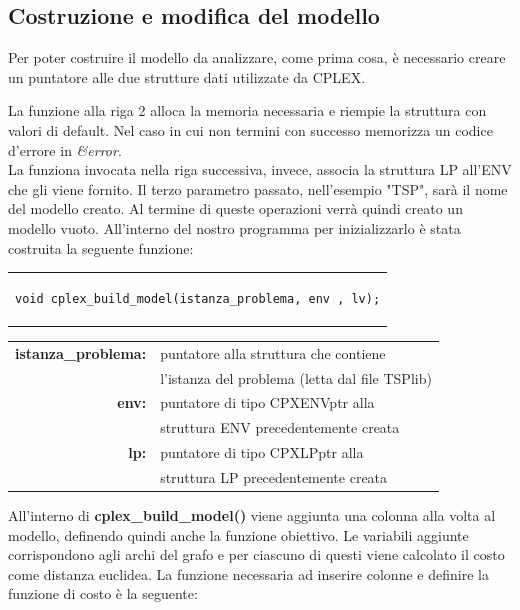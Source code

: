 \subsection{Costruzione e modifica del modello}
Per poter costruire il modello da analizzare, come prima cosa, è necessario creare un puntatore alle due strutture dati utilizzate da CPLEX.

La funzione alla riga 2 alloca la memoria necessaria e riempie la struttura con valori di default. Nel caso in cui non termini con successo memorizza un codice d'errore in \textit{\&error}.\\
La funziona invocata nella riga successiva, invece, associa la struttura LP all'ENV che gli viene fornito. Il terzo parametro passato, nell'esempio "TSP", sarà il nome del modello creato.
Al termine di queste operazioni verrà quindi creato un modello vuoto. All'interno del nostro programma per inizializzarlo è stata costruita la seguente funzione:
\begin{center}
\begin{tabular}{c}
\begin{lstlisting}[linewidth=320pt, basicstyle=\footnotesize\sffamily,] 
void cplex_build_model(istanza_problema, env , lv);
\end{lstlisting}
\end{tabular}
\end{center}
\vspace{1cm}
\begin{table}[h]
\centering
\begin{tabular}{rl}
\textbf{istanza\_problema: } & {puntatore alla struttura che contiene} \\
&  {l'istanza del problema (letta dal file TSPlib)} \\
\textbf{env: } & {puntatore di tipo CPXENVptr alla}\\
& {struttura ENV precedentemente creata}\\
\textbf{lp: } & {puntatore di tipo CPXLPptr alla}\\
& {struttura LP  precedentemente creata}\\
\end{tabular}
\end{table}
All'interno di \textbf{cplex\_build\_model()} viene aggiunta una colonna alla volta al modello, definendo quindi anche la funzione obiettivo. Le variabili aggiunte corrispondono agli archi del grafo e per ciascuno di questi viene calcolato il costo come distanza euclidea. La funzione necessaria ad inserire colonne e definire la funzione di costo è la seguente:
